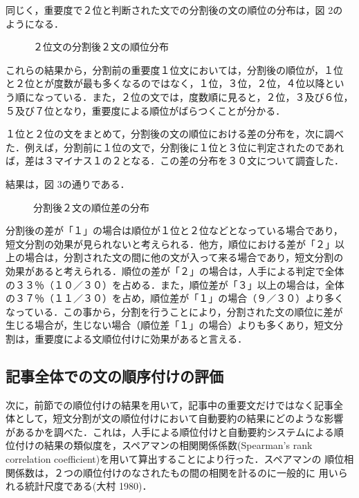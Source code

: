 \vspace{-3mm}
同じく，重要度で２位と判断された文での分割後の文の順位の分布は，図 2の
ようになる．

\begin{figure}[!hb]
\vspace{-3mm}
\begin{center}
\mbox{}
\end{center}
\vspace{-1mm}
\caption{２位文の分割後２文の順位分布}
\end{figure}


\clearpage
これらの結果から，分割前の重要度１位文においては，分割後の順位が，１位
と２位とが度数が最も多くなるのではなく，１位，３位，２位，４位以降とい
う順になっている．また，２位の文では，度数順に見ると，２位，３及び６位，
５及び７位となり，重要度による順位がばらつくことが分かる．

１位と２位の文をまとめて，分割後の文の順位における差の分布を，次に調べ
た．例えば，分割前に１位の文で，分割後に１位と３位に判定されたのであれ
ば，差は３マイナス１の２となる．この差の分布を３０文について調査した．

結果は，図 3の通りである．

\begin{figure}[h]
\begin{center}
\mbox{}
\end{center}
\caption{分割後２文の順位差の分布}
\end{figure}

分割後の差が「１」の場合は順位が１位と２位などとなっている場合であり，
短文分割の効果が見られないと考えられる．他方，順位における差が「２」以
上の場合は，分割された文の間に他の文が入って来る場合であり，短文分割の
効果があると考えられる．順位の差が「２」の場合は，人手による判定で全体
の３３％（１０／３０）を占める．また，順位差が「３」以上の場合は，全体
の３７％（１１／３０）を占め，順位差が「１」の場合（９／３０）より多く
なっている．この事から，分割を行うことにより，分割された文の順位に差が
生じる場合が，生じない場合（順位差「１」の場合）よりも多くあり，短文分
割は，重要度による文順位付けに効果があると言える．


\subsection{記事全体での文の順序付けの評価}
次に，前節での順位付けの結果を用いて，記事中の重要文だけではなく記事全
体として，短文分割が文の順位付けにおいて自動要約の結果にどのような影響
があるかを調べた．これは，人手による順位付けと自動要約システムによる順
位付けの結果の類似度を，スペアマンの相関関係係数(Spearman's rank
correlation coefficient)を用いて算出することにより行った．スペアマンの
順位相関係数は，２つの順位付けのなされたもの間の相関を計るのに一般的に
用いられる統計尺度である(大村 1980)．

